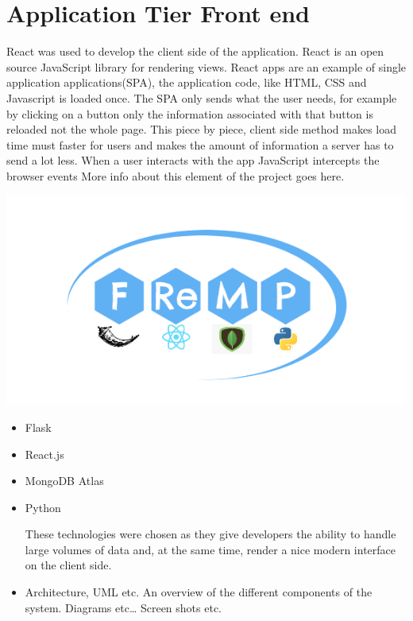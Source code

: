 \section{Application Tier Front end}
React was used to develop the client side of the application. React is an open source JavaScript library for rendering views. React apps are an example of single application applications(SPA), the application code, like HTML, CSS and Javascript is loaded once. The SPA only sends what the user needs, for example by clicking on a button only the information associated with that button is reloaded not the whole page. This piece by piece, client side method makes load time must faster for users and makes the amount of information a server has to send a lot less.
When a user interacts with the app JavaScript intercepts the browser events
More info about this element of the project goes here.
\begin{center}
      \includegraphics{img/fremp.PNG}
\end{center}

\begin{itemize}
\item Flask
\item React.js
\item MongoDB Atlas
\item Python


These technologies were chosen as they give developers the ability to handle large volumes of data and, at the same time, render a nice modern interface on the client side.
\item Architecture, UML etc. An overview of the different components of the system. Diagrams etc… Screen shots etc.
\end{itemize}

